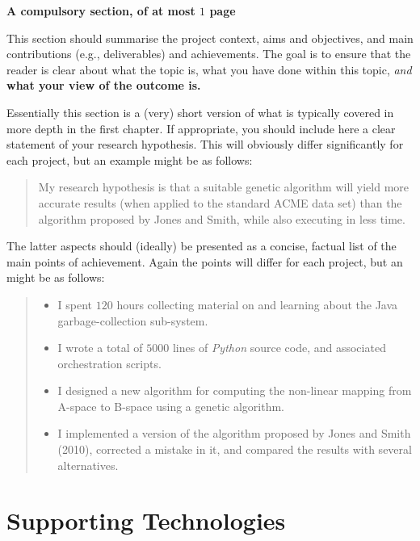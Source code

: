 \documentclass[ %
                    author={Natchalin Iwsakul \\[0.4em] Inkaphol Siriwongwattana \\[0.4em] Tanaphan Kummaraphat \\[0.6em] Patorn Srisupap},,
                supervisor={Fernando Moreno-Pino},
                    degree={MSc},
                     title={Propensity Modelling for SME Commercial Lending Using Open Public Data
},
                  subtitle={Companies House and GDELT as predictors of first-time borrowing},
                      type={},
                      year={2026}]{dissertation}
\begin{document}
{\bf A compulsory section, of at most $1$ page} 
\vspace{1cm} 

\noindent
This section should summarise the project context, aims and objectives,
and main contributions (e.g., deliverables) and achievements.  The goal is to ensure that the 
reader is clear about what the topic is, what you have done within this 
topic, {\em and}\/ {\bf what your view of the outcome is.}

Essentially 
this section is a (very) short version of what is typically covered in more depth in the first 
chapter.  If appropriate, you should include here  
a clear statement of your research hypothesis.  This will obviously differ significantly
for each project, but an example might be as follows:

\begin{quote}
My research hypothesis is that a suitable genetic algorithm will yield
more accurate results (when applied to the standard ACME data set) than 
the algorithm proposed by Jones and Smith, while also executing in less
time.
\end{quote}

\noindent
The latter aspects should (ideally) be presented as a concise, factual 
list of the main points of achievement.  Again the points will differ for each project, but 
an might be as follows:

\begin{quote}
\noindent
\begin{itemize}
\item I spent $120$ hours collecting material on and learning about the 
      Java garbage-collection sub-system. 
\item I wrote a total of $5000$ lines of {\em Python} source code, and associated orchestration scripts. 
\item I designed a new algorithm for computing the non-linear mapping 
      from A-space to B-space using a genetic algorithm.
\item I implemented a version of the algorithm proposed by Jones and 
      Smith (2010), corrected a mistake in it, and 
      compared the results with several alternatives.
\end{itemize}
\end{quote}




\chapter*{Supporting Technologies}
\end{document}
